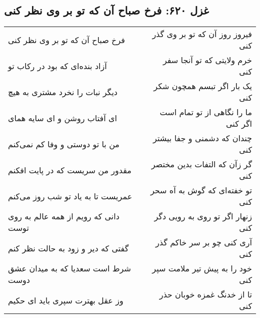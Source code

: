 \begin{center}
\section*{غزل ۶۲۰: فرخ صباح آن که تو بر وی نظر کنی}
\label{sec:620}
\begin{longtable}{l p{0.5cm} r}
فرخ صباح آن که تو بر وی نظر کنی
&&
فیروز روز آن که تو بر وی گذر کنی
\\
آزاد بنده‌ای که بود در رکاب تو
&&
خرم ولایتی که تو آنجا سفر کنی
\\
دیگر نبات را نخرد مشتری به هیچ
&&
یک بار اگر تبسم همچون شکر کنی
\\
ای آفتاب روشن و ای سایه همای
&&
ما را نگاهی از تو تمام است اگر کنی
\\
من با تو دوستی و وفا کم نمی‌کنم
&&
چندان که دشمنی و جفا بیشتر کنی
\\
مقدور من سریست که در پایت افکنم
&&
گر زآن که التفات بدین مختصر کنی
\\
عمریست تا به یاد تو شب روز می‌کنم
&&
تو خفته‌ای که گوش به آه سحر کنی
\\
دانی که رویم از همه عالم به روی توست
&&
زنهار اگر تو روی به رویی دگر کنی
\\
گفتی که دیر و زود به حالت نظر کنم
&&
آری کنی چو بر سر خاکم گذر کنی
\\
شرط است سعدیا که به میدان عشق دوست
&&
خود را به پیش تیر ملامت سپر کنی
\\
وز عقل بهترت سپری باید ای حکیم
&&
تا از خدنگ غمزه خوبان حذر کنی
\\
\end{longtable}
\end{center}
